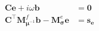 \begin{equation}
    \begin{split}
        \mathbf{C} \mathbf{e} + i\omega\mathbf{b} &= \mathbf{0} \\
        \mathbf{C}^\top \mathbf{M}_{\boldsymbol{\mu}^{-1}}^f \mathbf{b} - \mathbf{M}_{\boldsymbol{\sigma}}^e \mathbf{e} &= \mathbf{s_e}
    \end{split}
    \label{eq:DiscreteFDEMEB}
\end{equation}
